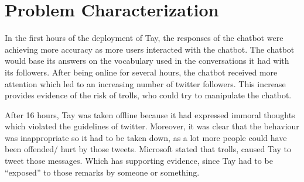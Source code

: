 \chapter{Problem Characterization}
In the first hours of the deployment of Tay, the responses of the chatbot were achieving more accuracy as more users interacted with the chatbot. The chatbot would base its answers on the vocabulary used in the conversations it had with its followers. After being online for several hours, the chatbot received more attention which led to an increasing number of twitter followers. This increase provides evidence of the risk of trolls, who could try to manipulate the chatbot.

After 16 hours, Tay was taken offline because it had expressed immoral thoughts which violated the guidelines of twitter. Moreover, it was clear that the behaviour was inappropriate so it had to be taken down, as a lot more people could have been offended/ hurt by those tweets. Microsoft stated that trolls\cite{definitionOfATroll}, caused Tay to tweet those messages\cite{microsoftstatement}. Which has supporting evidence, since Tay had to be “exposed” to those remarks by someone or something.